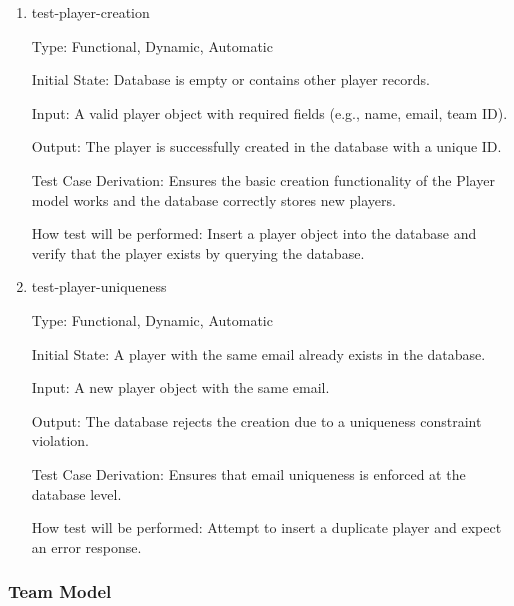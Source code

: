 \documentclass[12pt, titlepage]{article}
\begin{document}
\begin{enumerate}

    \item{test-player-creation\\}

    Type: Functional, Dynamic, Automatic

    Initial State: Database is empty or contains other player records.

    Input: A valid player object with required fields (e.g., name, email, team ID).

    Output: The player is successfully created in the database with a unique ID.

    Test Case Derivation: Ensures the basic creation functionality of the Player model works and the database correctly stores new players.

    How test will be performed: Insert a player object into the database and verify that the player exists by querying the database.

\item{test-player-uniqueness\\}

    Type: Functional, Dynamic, Automatic

    Initial State: A player with the same email already exists in the database.

    Input: A new player object with the same email.

    Output: The database rejects the creation due to a uniqueness constraint violation.

    Test Case Derivation: Ensures that email uniqueness is enforced at the database level.

    How test will be performed: Attempt to insert a duplicate player and expect an error response.

\end{enumerate}


\subsubsection{Team Model}
\end{document}
